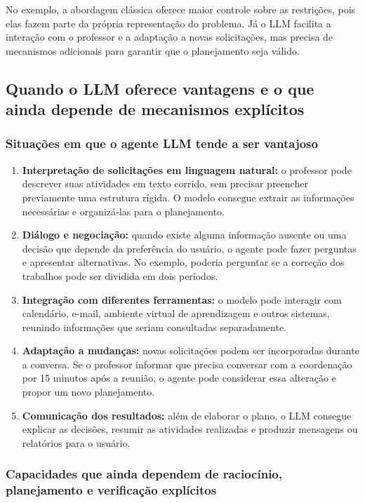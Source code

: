 \documentclass[12pt, a4paper]{article}
\begin{document}
No exemplo, a abordagem clássica oferece maior controle sobre as restrições, pois elas fazem parte da própria representação do problema. Já o LLM facilita a interação com o professor e a adaptação a novas solicitações, mas precisa de mecanismos adicionais para garantir que o planejamento seja válido.

\subsection{Quando o LLM oferece vantagens e o que ainda depende de mecanismos explícitos}

\subsubsection{Situações em que o agente LLM tende a ser vantajoso}

\begin{enumerate}[leftmargin=2em]
  \item \textbf{Interpretação de solicitações em linguagem natural:} o professor pode descrever suas atividades em texto corrido, sem precisar preencher previamente uma estrutura rígida. O modelo consegue extrair as informações necessárias e organizá-las para o planejamento.
  \item \textbf{Diálogo e negociação:} quando existe alguma informação ausente ou uma decisão que depende da preferência do usuário, o agente pode fazer perguntas e apresentar alternativas. No exemplo, poderia perguntar se a correção dos trabalhos pode ser dividida em dois períodos.
  \item \textbf{Integração com diferentes ferramentas:} o modelo pode interagir com calendário, e-mail, ambiente virtual de aprendizagem e outros sistemas, reunindo informações que seriam consultadas separadamente.
  \item \textbf{Adaptação a mudanças:} novas solicitações podem ser incorporadas durante a conversa. Se o professor informar que precisa conversar com a coordenação por 15 minutos após a reunião, o agente pode considerar essa alteração e propor um novo planejamento.
  \item \textbf{Comunicação dos resultados:} além de elaborar o plano, o LLM consegue explicar as decisões, resumir as atividades realizadas e produzir mensagens ou relatórios para o usuário.
\end{enumerate}

\subsubsection{Capacidades que ainda dependem de raciocínio, planejamento e verificação explícitos}
\end{document}
